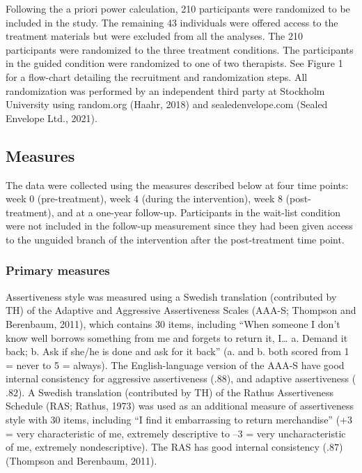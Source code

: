 \documentclass[3p]{elsarticle} %
\begin{document}
Following the a priori power calculation, 210 participants were
randomized to be included in the study. The remaining 43 individuals
were offered access to the treatment materials but were excluded from
all the analyses. The 210 participants were randomized to the three
treatment conditions. The participants in the guided condition were
randomized to one of two therapists. See Figure 1 for a flow-chart
detailing the recruitment and randomization steps. All randomization was
performed by an independent third party at Stockholm University using
random.org (Haahr, 2018) and sealedenvelope.com (Sealed Envelope Ltd.,
2021).

\hypertarget{measures}{%
\subsection{Measures}\label{measures}}

The data were collected using the measures described below at four time
points: week 0 (pre-treatment), week 4 (during the intervention), week 8
(post-treatment), and at a one-year follow-up. Participants in the
wait-list condition were not included in the follow-up measurement since
they had been given access to the unguided branch of the intervention
after the post-treatment time point.

\hypertarget{primary-measures}{%
\subsubsection{Primary measures}\label{primary-measures}}

Assertiveness style was measured using a Swedish translation
(contributed by TH) of the Adaptive and Aggressive Assertiveness Scales
(AAA-S; Thompson and Berenbaum, 2011), which contains 30 items,
including ``When someone I don't know well borrows something from me and
forgets to return it, I\ldots{} a. Demand it back; b. Ask if she/he is
done and ask for it back'' (a. and b. both scored from 1 = never to 5 =
always). The English-language version of the AAA-S have good internal
consistency for aggressive assertiveness (\(.88\)), and adaptive
assertiveness (\(.82\)). A Swedish translation (contributed by TH) of
the Rathus Assertiveness Schedule (RAS; Rathus, 1973) was used as an
additional measure of assertiveness style with 30 items, including ``I
find it embarrassing to return merchandise'' (+3 = very characteristic
of me, extremely descriptive to --3 = very uncharacteristic of me,
extremely nondescriptive). The RAS has good internal consistency
(\(.87\)) (Thompson and Berenbaum, 2011).
\end{document}
